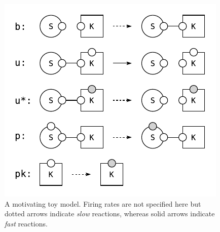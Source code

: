 \begin{figure}[!h]
  \vskip -0.2cm
  \begin{center}
    \includegraphics[scale=0.9]{figures/model.pdf}
  \end{center}
  \vskip -0.2cm
  \caption{A motivating toy model.   Firing rates are not specified here but
    dotted arrows indicate \textit{slow} reactions, whereas solid
    arrows indicate \textit{fast} reactions.}
  \label{fig:model}
\end{figure}
